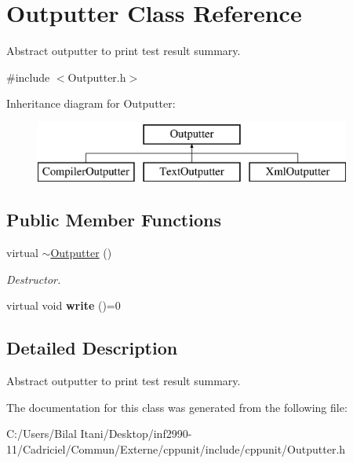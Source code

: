 \hypertarget{class_outputter}{}\section{Outputter Class Reference}
\label{class_outputter}


Abstract outputter to print test result summary.  




{\ttfamily \#include $<$Outputter.\+h$>$}

Inheritance diagram for Outputter\+:\begin{figure}[H]
\begin{center}
\leavevmode
\includegraphics[height=2.000000cm]{class_outputter}
\end{center}
\end{figure}
\subsection*{Public Member Functions}
\begin{DoxyCompactItemize}
\item 
virtual \hyperlink{class_outputter_a0af584ecb81380ff38e3875b65ad4dd5}{$\sim$\+Outputter} ()\hypertarget{class_outputter_a0af584ecb81380ff38e3875b65ad4dd5}{}\label{class_outputter_a0af584ecb81380ff38e3875b65ad4dd5}

\begin{DoxyCompactList}\small\item\em Destructor. \end{DoxyCompactList}\item 
virtual void {\bfseries write} ()=0\hypertarget{class_outputter_a0a5f32693d53ed33ceb8385041cb4b68}{}\label{class_outputter_a0a5f32693d53ed33ceb8385041cb4b68}

\end{DoxyCompactItemize}


\subsection{Detailed Description}
Abstract outputter to print test result summary. 

The documentation for this class was generated from the following file\+:\begin{DoxyCompactItemize}
\item 
C\+:/\+Users/\+Bilal Itani/\+Desktop/inf2990-\/11/\+Cadriciel/\+Commun/\+Externe/cppunit/include/cppunit/Outputter.\+h\end{DoxyCompactItemize}
